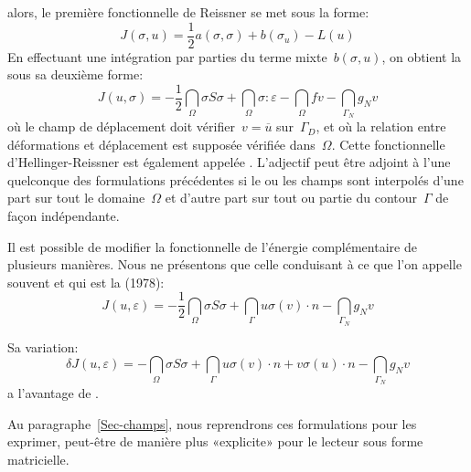 alors, le première fonctionnelle de Reissner se met sous la forme:
\begin{equation} J(\sigma,u) = \frac12a(\sigma,\sigma)+b(\sigma_u)-L(u)\end{equation}
En effectuant une intégration par parties du terme mixte~$b(\sigma,u)$, on obtient la
sous sa deuxième forme:
\begin{equation}
\label{Eq-HR2}
J(u,\sigma) =
-\frac12 \dint_\Omega \sigma S \sigma
+\dint_\Omega \sigma:\varepsilon
- \dint_\Omega f v
- \dint_{\Gamma_N} g_N v
\end{equation}
où le champ de déplacement doit vérifier~$v=\overline{u}$ sur~$\Gamma_D$, et où la relation entre déformations et déplacement est supposée vérifiée dans~$\Omega$.
Cette fonctionnelle d'Hellinger-Reissner est également appelée .
\medskipvm
L'adjectif  peut être adjoint à l'une quelconque des formulations précédentes si le ou les champs sont interpolés d'une part sur tout le domaine~$\Omega$ et d'autre part sur tout ou partie du contour~$\Gamma$ de façon indépendante.

Il est possible de modifier la fonctionnelle de l'énergie complémentaire de plusieurs manières.
Nous ne présentons que celle conduisant à ce que l'on appelle souvent  et qui est la  (1978):
\begin{equation}
J(u,\varepsilon) =
-\frac12 \dint_\Omega \sigma S \sigma
+\dint_\Gamma u \sigma(v)\cdot n
- \dint_{\Gamma_N} g_N v
\end{equation}

Sa variation:
\begin{equation}
\delta J(u,\varepsilon) =
-\dint_\Omega \sigma S \sigma
+\dint_\Gamma u \sigma(v)\cdot n + v \sigma(u)\cdot n
- \dint_{\Gamma_N} g_N v
\end{equation}
a l'avantage de .

\medskip
Au paragraphe~\ref{Sec-champs}, nous reprendrons ces formulations pour les exprimer, peut-être de manière plus «explicite» pour le lecteur sous forme matricielle.

